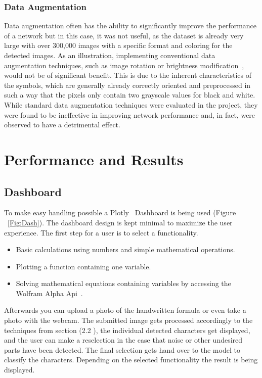 \documentclass[@CLASSOPTIONS@]{tumarticle}
\begin{document}
\subsubsection{Data Augmentation}
Data augmentation often has the ability to significantly improve the performance of a network but in this case, it
was not useful, as the dataset is already very large with over 300,000 images with a specific format and coloring for
the detected images.
As an illustration, implementing conventional data augmentation techniques, such as image rotation or brightness
modification~\cite{DataAugm}, would not be of significant benefit.
This is due to the inherent characteristics of the symbols, which are generally already correctly oriented and
preprocessed in such a way that the pixels only contain two grayscale values for black and white.
While standard data augmentation techniques were evaluated in the project, they were found to be ineffective in
improving network performance and, in fact, were observed to have a detrimental effect.

\section{Performance and Results}
\label{sec:customization}

\subsection{Dashboard}
\label{subsec:dash}
To make easy handling possible a Plotly~\cite{plotly} Dashboard is being used (Figure ~\ref{Fig:Dash}).
The dashboard design is kept minimal to maximize the user experience.
The first step for a user is to select a functionality.
\begin{itemize}
\item Basic calculations using numbers and simple mathematical operations.
\item Plotting a function containing one variable.
\item Solving mathematical equations containing variables by accessing the
Wolfram Alpha Api~\cite{wolfram}.
\end{itemize}
Afterwards you can upload a photo of the handwritten formula or even take a photo
with the webcam.
The submitted image gets processed accordingly to the techniques from section (2.2 ),
the individual detected characters get displayed, and the user can make a reselection
in the case that noise or other undesired parts have been detected.
The final selection gets hand over to the model to classify the characters.
Depending on the selected functionality the result is being displayed.
\end{document}
